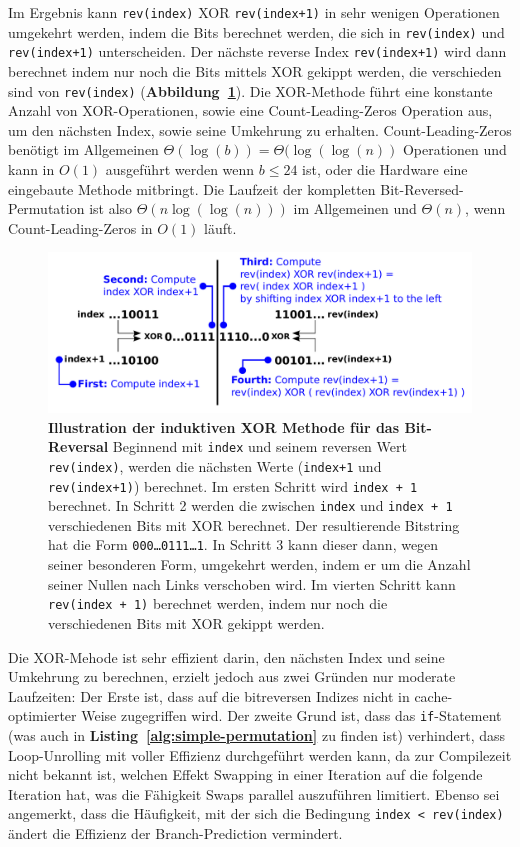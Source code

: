 \documentclass[10pt]{article}
\begin{document}
Im Ergebnis kann {\tt rev(index)} XOR {\tt rev(index+1)} in sehr wenigen Operationen umgekehrt werden, indem die 
Bits berechnet werden, die sich in  {\tt rev(index)} und {\tt rev(index+1)} unterscheiden. 
Der nächste reverse Index {\tt rev(index+1)} wird dann berechnet indem nur noch die Bits mittels XOR gekippt werden, die 
verschieden sind von {\tt rev(index)} ({\bf Abbildung~\ref{figure:xor}}). 
Die XOR-Methode führt eine konstante Anzahl von XOR-Operationen, sowie eine Count-Leading-Zeros Operation aus, um 
den nächsten Index, sowie seine Umkehrung zu erhalten. Count-Leading-Zeros benötigt im Allgemeinen $\Theta(\log(b)) = \Theta(\log(\log(n))$ 
Operationen und kann in $O(1)$ ausgeführt werden wenn $b \leq 24$ ist, oder die Hardware eine eingebaute Methode mitbringt.
Die Laufzeit der kompletten Bit-Reversed-Permutation ist also $\Theta(n \log(\log(n)))$ im Allgemeinen und $\Theta(n)$, wenn Count-Leading-Zeros
in $O(1)$ läuft. 

\begin{figure}
\centering
\includegraphics[width=6in]{cartoons/xor.pdf}
\caption{{\bf Illustration der induktiven XOR Methode für das Bit-Reversal} 
    Beginnend mit {\tt index} und seinem reversen Wert 
  {\tt rev(index)}, werden die nächsten Werte ({\tt index+1} und {\tt
  rev(index+1)}) berechnet. Im ersten Schritt wird {\tt index + 1} berechnet. In Schritt 2
  werden die zwischen {\tt index} und {\tt index + 1} verschiedenen Bits mit XOR berechnet. 
  Der resultierende Bitstring hat die Form {\tt 000\ldots 0111\ldots 1}. In Schritt 3 kann 
  dieser dann, wegen seiner besonderen Form, umgekehrt werden, indem er um die Anzahl seiner 
  Nullen nach Links verschoben wird. Im vierten Schritt kann {\tt rev(index + 1)} berechnet werden,
  indem nur noch die verschiedenen Bits mit XOR gekippt werden.
  \label{figure:xor}}
\end{figure}

Die XOR-Mehode ist sehr effizient darin, den nächsten Index und seine Umkehrung zu 
berechnen, erzielt jedoch aus zwei Gründen nur moderate Laufzeiten:
Der Erste ist, dass auf die bitreversen Indizes nicht in cache-optimierter Weise zugegriffen wird. 
Der zweite Grund ist, dass das {\tt if}-Statement (was auch in {\bf Listing~\ref{alg:simple-permutation}}
zu finden ist) verhindert, dass Loop-Unrolling mit voller Effizienz durchgeführt werden kann, da
zur Compilezeit nicht bekannt ist, welchen Effekt Swapping in einer Iteration auf die folgende Iteration hat, was
die Fähigkeit Swaps parallel auszuführen limitiert. Ebenso sei angemerkt, dass die Häufigkeit, mit der 
sich die Bedingung {\tt index < rev(index)} ändert die Effizienz der Branch-Prediction vermindert.
\end{document}
